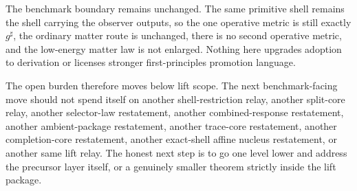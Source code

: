 \documentclass[11pt]{article}
\newcommand{\CompletedMetric}{g^{\sharp}}
\begin{document}
The benchmark boundary remains unchanged. The same primitive shell remains the shell carrying the observer outputs, so the one operative metric is still exactly \(\CompletedMetric\), the ordinary matter route is unchanged, there is no second operative metric, and the low-energy matter law is not enlarged. Nothing here upgrades adoption to derivation or licenses stronger first-principles promotion language.

The open burden therefore moves below lift scope. The next benchmark-facing move should not spend itself on another shell-restriction relay, another split-core relay, another selector-law restatement, another combined-response restatement, another ambient-package restatement, another trace-core restatement, another completion-core restatement, another exact-shell affine nucleus restatement, or another same lift relay. The honest next step is to go one level lower and address the precursor layer itself, or a genuinely smaller theorem strictly inside the lift package.
\end{document}
